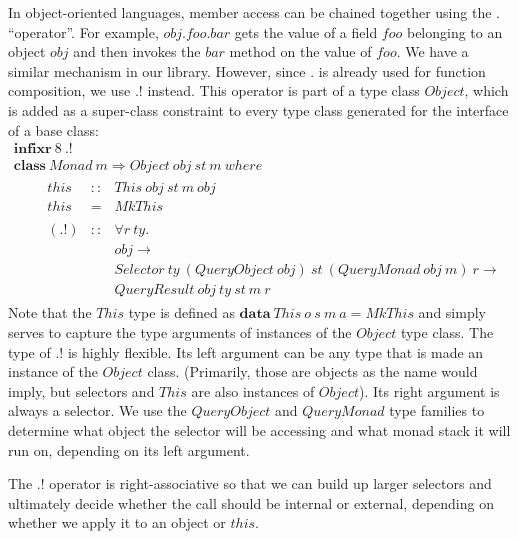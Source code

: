In object-oriented languages, member access can be chained together using the $.$ ``operator''. For example, $\mathit{obj}.\mathit{foo}.\mathit{bar}$ gets the value of a field $\mathit{foo}$ belonging to an object $\mathit{obj}$ and then invokes the $\mathit{bar}$ method on the value of $\mathit{foo}$. We have a similar mechanism in our library. However, since $.$ is already used for function composition, we use $.!$ instead. This operator is part of a type class $\mathit{Object}$, which is added as a super-class constraint to every type class generated for the interface of a base class:
\begin{displaymath}
\begin{array}{l}
\mathbf{infixr}~8~.!\\
\mathbf{class}~\mathit{Monad}~m \Rightarrow \mathit{Object}~\mathit{obj}~\mathit{st}~m~\mathit{where} \\
\qquad \begin{array}{lcl}
\mathit{this} & :: & \mathit{This}~\mathit{obj}~\mathit{st}~\mathit{m}~\mathit{obj} \\
\mathit{this} & = & \mathit{MkThis} \\\\

(.!) & :: & \forall r~\mathit{ty}.\\ 
     &    & \mathit{obj} \to \\
     &    & \mathit{Selector}~\mathit{ty}~(\mathit{QueryObject}~\mathit{obj})~\mathit{st}~(\mathit{QueryMonad}~\mathit{obj}~\mathit{m})~r \to  \\
     &    & \mathit{QueryResult}~\mathit{obj}~\mathit{ty}~\mathit{st}~m~r
\end{array}
\end{array}
\end{displaymath}
Note that the $\mathit{This}$ type is defined as $\mathbf{data}~\mathit{This}~o~s~m~a = \mathit{MkThis}$ and simply serves to capture the type arguments of instances of the $\mathit{Object}$ type class. The type of $.!$ is highly flexible. Its left argument can be any type that is made an instance of the $\mathit{Object}$ class. (Primarily, those are objects as the name would imply, but selectors and $\mathit{This}$ are also instances of $\mathit{Object}$).
Its right argument is always a selector. We use the $\mathit{QueryObject}$ and $\mathit{QueryMonad}$ type families to determine what object the selector will be accessing and what monad stack it will run on, depending on its left argument.

The $.!$ operator is right-associative so that we can build up larger selectors and ultimately decide whether the call should be internal or external, depending on whether we apply it to an object or $\mathit{this}$.

